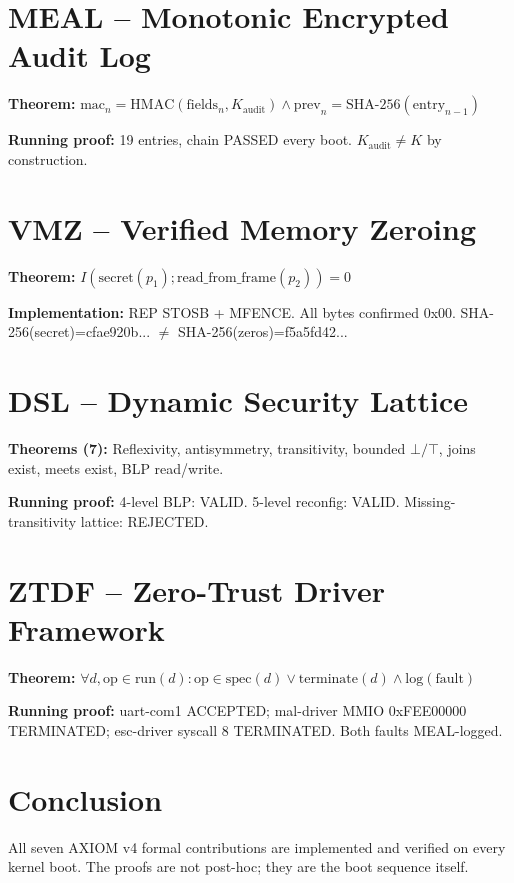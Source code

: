\documentclass[10pt,twocolumn]{article}
\begin{document}
\section{MEAL -- Monotonic Encrypted Audit Log}
\textbf{Theorem:} $\text{mac}_n=\text{HMAC}(\text{fields}_n,K_\text{audit})
\wedge \text{prev}_n=\text{SHA-256}(\text{entry}_{n-1})$

\textbf{Running proof:} 19 entries, chain PASSED every boot.
$K_\text{audit}\neq K$ by construction.

\section{VMZ -- Verified Memory Zeroing}
\textbf{Theorem:} $I(\text{secret}(p_1);\text{read\_from\_frame}(p_2))=0$

\textbf{Implementation:} REP STOSB + MFENCE. All bytes confirmed 0x00.
SHA-256(secret)=cfae920b... $\neq$ SHA-256(zeros)=f5a5fd42...

\section{DSL -- Dynamic Security Lattice}
\textbf{Theorems (7):} Reflexivity, antisymmetry, transitivity,
bounded $\bot/\top$, joins exist, meets exist, BLP read/write.

\textbf{Running proof:} 4-level BLP: VALID. 5-level reconfig: VALID.
Missing-transitivity lattice: REJECTED.

\section{ZTDF -- Zero-Trust Driver Framework}
\textbf{Theorem:} $\forall d,\text{op}\in\text{run}(d):
\text{op}\in\text{spec}(d) \vee \text{terminate}(d)\wedge\text{log}(\text{fault})$

\textbf{Running proof:} uart-com1 ACCEPTED; mal-driver MMIO 0xFEE00000
TERMINATED; esc-driver syscall 8 TERMINATED. Both faults MEAL-logged.

\section{Conclusion}
All seven AXIOM v4 formal contributions are implemented and verified
on every kernel boot. The proofs are not post-hoc; they are the boot
sequence itself.
\end{document}
